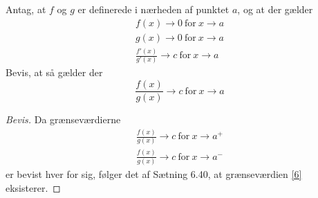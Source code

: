 \documentclass[12pt]{article}
\begin{document}
Antag, at $f$ og $g$ er definerede i nærheden af punktet $a$, og at der gælder
\begin{align}
f(x) \to 0 \ \text{for} \ x \to a \\
g(x) \to 0 \ \text{for} \ x \to a \\
\frac{f'(x)}{g'(x)}\to c \ \text{for} \ x \to a
\end{align}
Bevis, at så gælder der
\begin{equation}
\frac{f(x)}{g(x)} \to c \ \text{for} \ x \to a
\label{6}
\end{equation}
\begin{proof}[Bevis] Da grænseværdierne
\begin{align}
\frac{f(x)}{g(x)} \to c \ \text{for} \ x \to a^+ \\
\frac{f(x)}{g(x)} \to c \ \text{for} \ x \to a^-
\end{align}
er bevist hver for sig, følger det af Sætning 6.40, at grænseværdien \eqref{6} eksisterer.
\end{proof}
\end{document}
